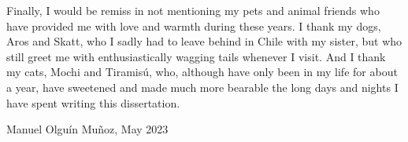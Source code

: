Finally, I would be remiss in not mentioning my pets and animal friends who have provided me with love and warmth during these years.
I thank my dogs, Aros and Skatt, who I sadly had to leave behind in Chile with my sister, but who still greet me with enthusiastically wagging tails whenever I visit.
And I thank my cats, Mochi and Tiramisú, who, although have only been in my life for about a year, have sweetened and made much more bearable the long days and nights I have spent writing this dissertation.

\medskip
{\begin{flushright}
    Manuel Olguín Muñoz, May 2023
\end{flushright}}
